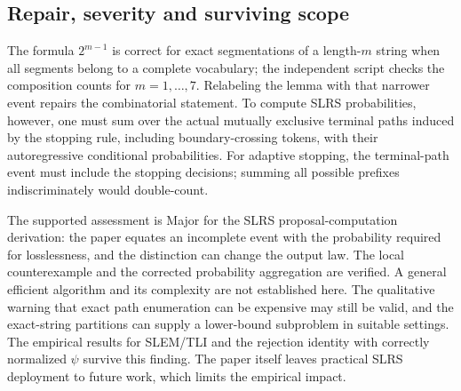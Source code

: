 \documentclass[10pt]{article}
\begin{document}
\subsection*{Repair, severity and surviving scope}
The formula \(2^{m-1}\) is correct for exact segmentations of a length-\(m\) string when all segments belong to a complete vocabulary; the independent script checks the composition counts for \(m=1,\ldots,7\). Relabeling the lemma with that narrower event repairs the combinatorial statement. To compute SLRS probabilities, however, one must sum over the actual mutually exclusive terminal paths induced by the stopping rule, including boundary-crossing tokens, with their autoregressive conditional probabilities. For adaptive stopping, the terminal-path event must include the stopping decisions; summing all possible prefixes indiscriminately would double-count.\par
The supported assessment is Major for the SLRS proposal-computation derivation: the paper equates an incomplete event with the probability required for losslessness, and the distinction can change the output law. The local counterexample and the corrected probability aggregation are verified. A general efficient algorithm and its complexity are not established here. The qualitative warning that exact path enumeration can be expensive may still be valid, and the exact-string partitions can supply a lower-bound subproblem in suitable settings. The empirical results for SLEM/TLI and the rejection identity with correctly normalized \(\psi\) survive this finding. The paper itself leaves practical SLRS deployment to future work, which limits the empirical impact.\par
\end{document}
